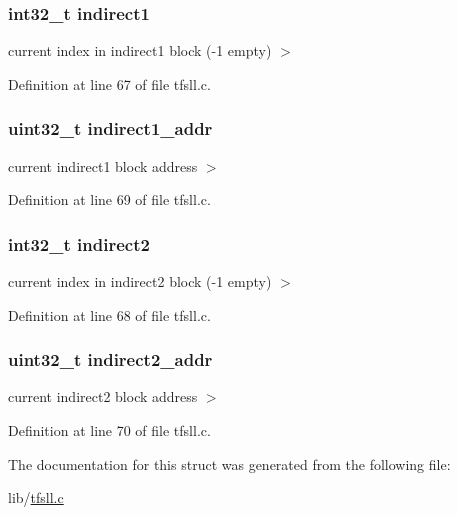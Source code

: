 \subsubsection[{indirect1}]{\setlength{\rightskip}{0pt plus 5cm}int32\+\_\+t indirect1}\label{struct__index_ab88ea15eb565a4f84685a02f5fbda9e5}
current index in indirect1 block (-\/1 empty) $>$ 

Definition at line 67 of file tfsll.\+c.

\hypertarget{struct__index_aebf2ea5d23f0b87754b15a441ae254f7}{}
\subsubsection[{indirect1\+\_\+addr}]{\setlength{\rightskip}{0pt plus 5cm}uint32\+\_\+t indirect1\+\_\+addr}\label{struct__index_aebf2ea5d23f0b87754b15a441ae254f7}
current indirect1 block address $>$ 

Definition at line 69 of file tfsll.\+c.

\hypertarget{struct__index_a26bb3bd357a55d414a7215c0be38f7a5}{}
\subsubsection[{indirect2}]{\setlength{\rightskip}{0pt plus 5cm}int32\+\_\+t indirect2}\label{struct__index_a26bb3bd357a55d414a7215c0be38f7a5}
current index in indirect2 block (-\/1 empty) $>$ 

Definition at line 68 of file tfsll.\+c.

\hypertarget{struct__index_a61003972ea04afde63442341b23aa31c}{}
\subsubsection[{indirect2\+\_\+addr}]{\setlength{\rightskip}{0pt plus 5cm}uint32\+\_\+t indirect2\+\_\+addr}\label{struct__index_a61003972ea04afde63442341b23aa31c}
current indirect2 block address $>$ 

Definition at line 70 of file tfsll.\+c.



The documentation for this struct was generated from the following file\+:\begin{DoxyCompactItemize}
\item 
lib/\hyperlink{tfsll_8c}{tfsll.\+c}\end{DoxyCompactItemize}
